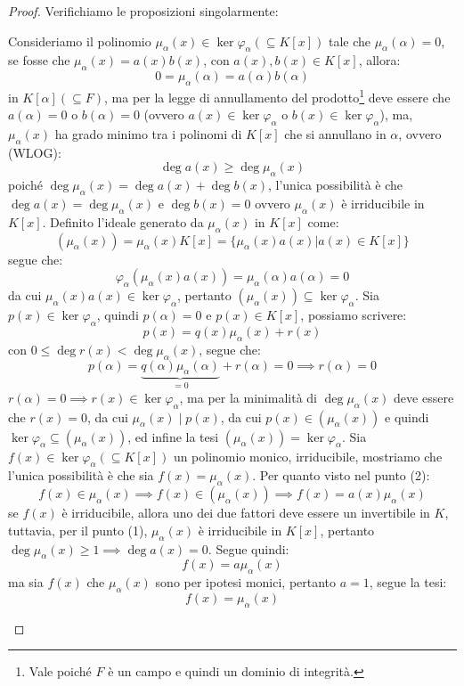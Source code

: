 \documentclass[11pt]{scrartcl}
\begin{document}
\begin{proof}
Verifichiamo le proposizioni singolarmente:
	\begin{enumerate}[(1)]
	\ii Consideriamo il polinomio $\mu_\alpha (x) \in \ker \varphi_\alpha (\subseteq K[x])$ tale che $\mu_\alpha (\alpha) = 0$, se fosse che $\mu_\alpha (x) = a(x)b(x)$, con $a(x),b(x) \in K[x]$, allora:
		\[ 0 = \mu_\alpha (\alpha) = a(\alpha)b(\alpha)
		\]
in $K[\alpha] (\subseteq F)$, ma per la legge di annullamento del prodotto\footnote{Vale poiché $F$ è un campo e quindi un dominio di integrità.} deve essere che $a(\alpha) = 0$ o $b(\alpha) = 0$ (ovvero $a(x)  \in \ker \varphi_\alpha$ o $b(x)  \in \ker \varphi_\alpha$), ma, $\mu_\alpha (x)$ ha grado minimo tra i polinomi di $K[x]$ che si annullano in $\alpha$, ovvero (WLOG):
		\[ \deg a(x) \geq \deg \mu_\alpha(x)
		\]
		poiché $ \deg \mu_\alpha(x) =  \deg a(x) +  \deg b(x)$, l'unica possibilità è che $\deg a(x) = \deg \mu_\alpha(x)$ e $\deg b(x) = 0$ ovvero $\mu_\alpha (x)$ è irriducibile in $K[x]$.
	\ii Definito l'ideale generato da $\mu_\alpha (x)$ in $K[x]$ come:
		\[ (\mu_\alpha (x)) = \mu_\alpha (x)K[x] = \{\mu_\alpha (x)a(x) | a(x) \in K[x]\}
		\]
		segue che:
			\[ \varphi_\alpha(\mu_\alpha (x)a(x)) = \mu_\alpha (\alpha)a(\alpha) = 0
			\]
		da cui $\mu_\alpha (x)a(x) \in \ker \varphi_\alpha$, pertanto $(\mu_\alpha (x)) \subseteq \ker \varphi_\alpha$. Sia $p(x) \in \ker \varphi_\alpha$, quindi $p(\alpha) = 0$ e $p(x) \in K[x]$, possiamo scrivere:
		\[ p(x)=q(x)\mu_\alpha (x) + r(x)
		\]
		con $0\leq \deg r(x) < \deg \mu_\alpha (x)$, segue che:
		\[ p(\alpha) = \underbrace{q(\alpha)\mu_\alpha (\alpha)}_{=0} + r(\alpha) = 0 \implies r(\alpha) = 0
		\]
		$r(\alpha) = 0 \implies r(x) \in \ker \varphi_\alpha$, ma per la minimalità di $\deg \mu_\alpha (x)$ deve essere che $r(x) = 0$, da cui $\mu_\alpha (x) \mid p(x)$, da cui $p(x) \in (\mu_\alpha (x))$ e 
		quindi $\ker\varphi_\alpha \subseteq (\mu_\alpha (x))$, ed infine la tesi $(\mu_\alpha (x)) = \ker\varphi_\alpha$.
	\ii Sia $f(x) \in \ker\varphi_\alpha (\subseteq K[x])$ un polinomio monico, irriducibile, mostriamo che l'unica possibilità è che sia $f(x) = \mu_\alpha (x)$. Per quanto visto nel punto (2):
		\[ f(x) \in \mu_\alpha (x) \implies f(x) \in (\mu_\alpha (x)) \implies f(x) = a(x)\mu_\alpha (x)
		\]
		se $f(x)$ è irriducibile, allora uno dei due fattori deve essere un invertibile in $K$, tuttavia, per il punto (1), $\mu_\alpha (x)$ è irriducibile in $K[x]$, pertanto $\deg \mu_\alpha (x) \geq 1 \implies \deg a(x) = 0$. Segue quindi:
			\[ f(x) = a\mu_\alpha (x)
			\]
			ma sia $f(x)$ che $\mu_\alpha (x)$ sono per ipotesi monici, pertanto $a = 1$, segue la tesi:
			\[ f(x) = \mu_\alpha (x)
			\]
	\end{enumerate}
\end{proof}
 
\end{document}
